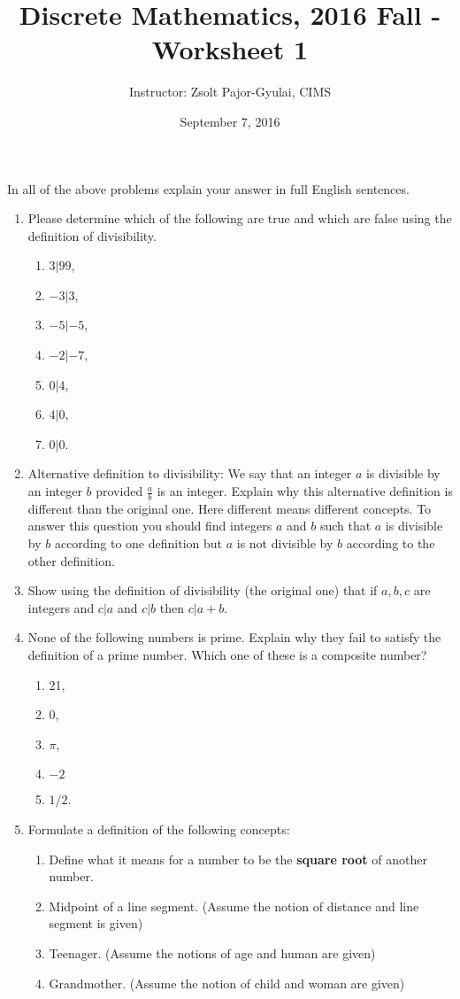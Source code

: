 \documentclass[11pt]{preprint}
\title{Discrete Mathematics, 2016 Fall - Worksheet 1}
\author{Instructor: Zsolt Pajor-Gyulai, CIMS}
\date{September 7, 2016}
\begin{document}
\maketitle

In all of the above problems explain your answer in full English sentences.


\begin{enumerate}
\item Please determine which of the following are true and which are false using the definition of divisibility. 
\begin{enumerate}
\item $3|99$,
\item $-3|3$,
\item $-5|-5$,
\item $-2|-7$,
\item $0|4$,
\item $4|0$,
\item $0|0$.
\end{enumerate}
\item Alternative definition to divisibility: We say that an integer $a$ is divisible by an integer $b$ provided $\frac{a}{b}$ is an integer. Explain why this alternative definition is different than the original one. Here different means different concepts. To answer this question you should find integers $a$ and $b$ such that $a$ is divisible by $b$  according to one definition but $a$ is not divisible by $b$ according to the other definition.

\item Show using the definition of divisibility (the original one) that if $a,b,c$ are integers and $c|a$ and $c|b$ then $c|a+b$.

\item None of the following numbers is prime. Explain why they fail to satisfy the definition of a prime number. Which one of these is a composite number?
\begin{enumerate}
\item 21,
\item 0,
\item $\pi$,
\item $-2$
\item $1/2$.
\end{enumerate}
\newpage

\item Formulate a definition of the following concepts:
\begin{enumerate}
\item Define what it means for a number to be the \textbf{square root} of another number.
\item Midpoint of a line segment. (Assume the notion of distance and line segment is given)
\item Teenager. (Assume the notions of age and human are given)
\item Grandmother. (Assume the notion of child and woman are given)
\end{enumerate}

\end{enumerate}
\end{document}
